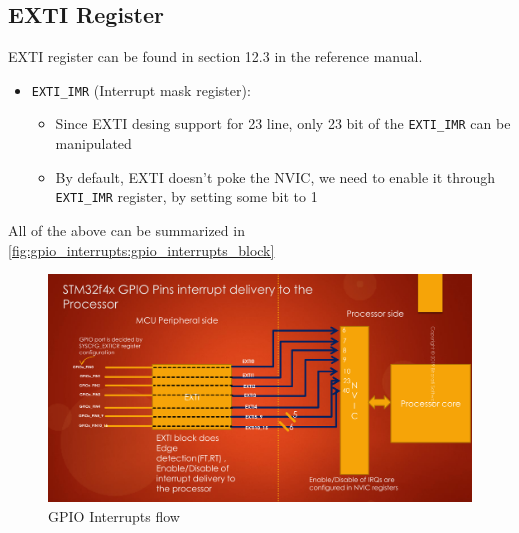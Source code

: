 \subsection{EXTI Register}

EXTI register can be found in section 12.3 in the reference manual.

\begin{itemize}

\item \verb|EXTI_IMR| (Interrupt mask register):

    \begin{itemize}
    
        \item Since EXTI desing support for 23 line, only 23 bit of the \verb|EXTI_IMR| can be manipulated

        \item  By default, EXTI doesn't poke the NVIC, we need to enable it through \verb|EXTI_IMR| register, by setting some bit to 1
    
    \end{itemize}

\end{itemize}


All of the above can be summarized in \autoref{fig:gpio_interrupts:gpio_interrupts_block}

\begin{figure}[h]
\centering
\includegraphics[scale=0.3,frame]{Figures/gpio_interrupts/gpio_interrupts_block}
\caption{GPIO Interrupts flow}
\label{fig:gpio_interrupts:gpio_interrupts_block}
\end{figure}

